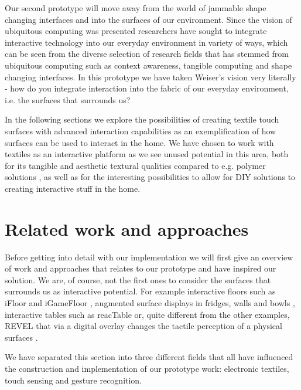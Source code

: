 Our second prototype will move away from the world of jammable shape changing interfaces and into the surfaces of our environment.
Since the vision of ubiquitous computing was presented researchers have sought to integrate interactive technology into our everyday environment in variety of ways, which can be seen from the diverse selection of research fields that has stemmed from ubiquitous computing such as context awareness, tangible computing and shape changing interfaces.
In this prototype we have taken Weiser's vision very literally - how do you integrate interaction into the fabric of our everyday environment, i.e. the surfaces that surrounds us?

In the following sections we explore the possibilities of creating textile touch surfaces with advanced interaction capabilities as an exemplification of how surfaces can be used to interact in the home.
We have chosen to work with textiles as an interactive platform as we see unused potential in this area, both for its tangible and aesthetic textural qualities compared to e.g. polymer solutions \cite{rosenberg2009unmousepad}, as well as for the interesting possibilities to allow for DIY solutions to creating interactive stuff in the home.

\section{Related work and approaches}
Before getting into detail with our implementation we will first give an overview of work and approaches that relates to our prototype and have inspired our solution.
We are, of course, not the first ones to consider the surfaces that surrounds us as interactive potential.
For example interactive floors such as iFloor \citep{petersen2005floor} and  iGameFloor \citep{gronbaek2007igamefloor}, augmented surface displays in fridges, walls and bowls \citep{taylor2007homes}, interactive tables such as reacTable \citep{jorda2007reactable} or, quite different from the other examples, REVEL that via a digital overlay changes the tactile perception of a physical surfaces \citep{bau2013revel}.

We have separated this section into three different fields that all have influenced the construction and implementation of our prototype work: electronic textiles, touch sensing and gesture recognition.
 
